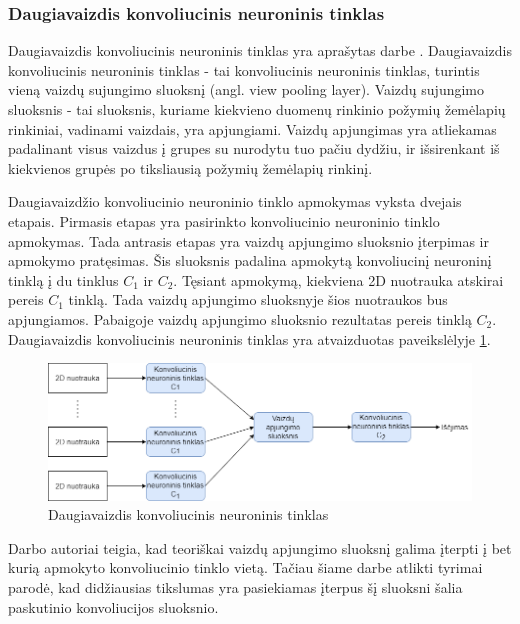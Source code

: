 \subsubsection{Daugiavaizdis konvoliucinis neuroninis tinklas}

Daugiavaizdis konvoliucinis neuroninis tinklas yra aprašytas darbe \cite{cnnExp1}. Daugiavaizdis konvoliucinis neuroninis tinklas - tai konvoliucinis neuroninis tinklas, turintis vieną vaizdų sujungimo sluoksnį (angl. view pooling layer). Vaizdų sujungimo sluoksnis - tai sluoksnis, kuriame kiekvieno duomenų rinkinio požymių žemėlapių rinkiniai, vadinami vaizdais, yra apjungiami. Vaizdų apjungimas yra atliekamas padalinant visus vaizdus į grupes su nurodytu tuo pačiu dydžiu, ir išsirenkant iš kiekvienos grupės po tiksliausią požymių žemėlapių rinkinį.

Daugiavaizdžio konvoliucinio neuroninio tinklo apmokymas vyksta dvejais etapais. Pirmasis etapas yra pasirinkto konvoliucinio neuroninio tinklo apmokymas. Tada antrasis etapas yra vaizdų apjungimo sluoksnio įterpimas ir apmokymo pratęsimas. Šis sluoksnis padalina apmokytą konvoliucinį neuroninį tinklą į du tinklus $C_1$ ir $C_2$. Tęsiant apmokymą, kiekviena 2D nuotrauka atskirai pereis $C_1$ tinklą. Tada vaizdų apjungimo sluoksnyje šios nuotraukos bus apjungiamos. Pabaigoje vaizdų apjungimo sluoksnio rezultatas pereis tinklą $C_2$. Daugiavaizdis konvoliucinis neuroninis tinklas yra atvaizduotas paveikslėlyje \ref{img:mvcnn}.

\begin{figure}[H]
	\centering
	\includegraphics[scale=0.5]{img/mvcnn.png}
	\caption{Daugiavaizdis konvoliucinis neuroninis tinklas}
	\label{img:mvcnn}
\end{figure}

Darbo \cite{cnnExp1} autoriai teigia, kad teoriškai vaizdų apjungimo sluoksnį galima įterpti į bet kurią apmokyto konvoliucinio tinklo vietą. Tačiau šiame darbe atlikti tyrimai parodė, kad didžiausias tikslumas yra pasiekiamas įterpus šį sluoksni šalia paskutinio konvoliucijos sluoksnio.

